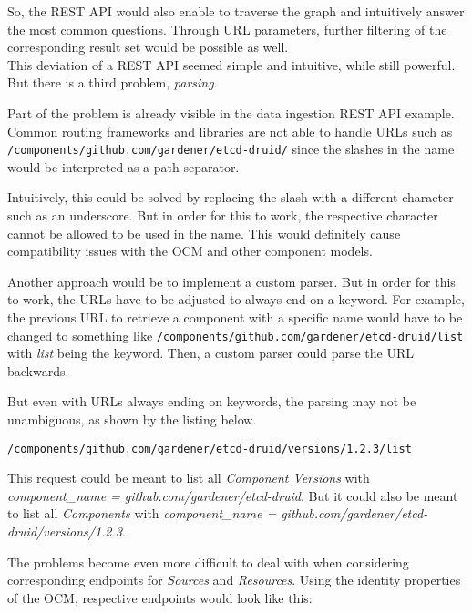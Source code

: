So, the REST API would also enable to traverse the graph and intuitively answer the most common questions. Through URL parameters, further filtering of the corresponding result set would be possible as well.\\

This deviation of a REST API seemed simple and intuitive, while still powerful. But there is a third problem, \emph{parsing}.\par
Part of the problem is already visible in the data ingestion REST API example. Common routing frameworks and libraries are not able to handle URLs such as \lstinline|/components/github.com/gardener/etcd-druid/| since the slashes in the name would be interpreted as a path separator.\par 
Intuitively, this could be solved by replacing the slash with a different character such as an underscore. But in order for this to work, the respective character cannot be allowed to be used in the name. This would definitely cause compatibility issues with the OCM and other component models.\par 
Another approach would be to implement a custom parser. But in order for this to work, the URLs have to be adjusted to always end on a keyword. For example, the previous URL to retrieve a component with a specific name would have to be changed to something like \lstinline|/components/github.com/gardener/etcd-druid/list| with \emph{list} being the keyword. Then, a custom parser could parse the URL backwards.\par
But even with URLs always ending on keywords, the parsing may not be unambiguous, as shown by the listing below.\\

\begin{lstlisting}[caption=Ambiguous REST API URL, captionpos=b, label=lst:Ambiguous URL]
/components/github.com/gardener/etcd-druid/versions/1.2.3/list
\end{lstlisting}

This request could be meant to list all \emph{Component Versions} with \emph{component\_name = github.com/gardener/etcd-druid}. But it could also be meant to list all \emph{Components} with \emph{component\_name = github.com/gardener/etcd-druid/versions/1.2.3}.\par
The problems become even more difficult to deal with when considering corresponding endpoints for \emph{Sources} and \emph{Resources}. Using the identity properties of the OCM, respective endpoints would look like this:\\


